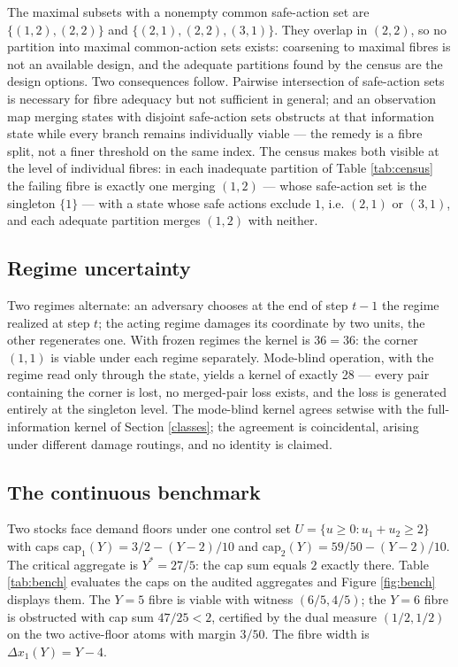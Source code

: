 \documentclass[10pt,twocolumn]{article}
\theoremstyle{definition}
\begin{document}
The maximal subsets with a nonempty common safe-action set are
\(\{(1,2), (2,2)\}\) and \(\{(2,1), (2,2), (3,1)\}\). They overlap in
\((2,2)\), so no partition into maximal common-action sets exists:
coarsening to maximal fibres is not an available design, and the
adequate partitions found by the census are the design options. Two
consequences follow. Pairwise intersection of safe-action sets is
necessary for fibre adequacy but not sufficient in general; and an
observation map merging states with disjoint safe-action sets obstructs
at that information state while every branch remains individually
viable --- the remedy is a fibre split, not a finer threshold on the
same index. The census makes both visible at the level of individual
fibres: in each inadequate partition of Table \ref{tab:census} the
failing fibre is exactly one merging \((1,2)\) --- whose safe-action
set is the singleton \(\{1\}\) --- with a state whose safe actions
exclude \(1\), i.e. \((2,1)\) or \((3,1)\), and each adequate
partition merges \((1,2)\) with neither.

\subsection{Regime uncertainty}\label{regimes}

Two regimes alternate: an adversary chooses at the end of step
\(t - 1\) the regime realized at step \(t\); the acting regime damages
its coordinate by two units, the other regenerates one. With frozen
regimes the kernel is \(36 = 36\): the corner \((1,1)\) is viable under
each regime separately. Mode-blind operation, with the regime read only
through the state, yields a kernel of exactly 28 --- every pair
containing the corner is lost, no merged-pair loss exists, and the loss
is generated entirely at the singleton level. The mode-blind kernel
agrees setwise with the full-information kernel of Section
\ref{classes}; the agreement is coincidental, arising under different
damage routings, and no identity is claimed.

\subsection{The continuous benchmark}\label{benchmark}

Two stocks face demand floors under one control set
\(U = \{u \ge 0 : u_1 + u_2 \ge 2\}\) with caps
\(\mathrm{cap}_1(Y) = 3/2 - (Y - 2)/10\) and
\(\mathrm{cap}_2(Y) = 59/50 - (Y - 2)/10\). The critical aggregate is
\(Y^{*} = 27/5\): the cap sum equals \(2\) exactly there. Table
\ref{tab:bench} evaluates the caps on the audited aggregates and Figure
\ref{fig:bench} displays them. The \(Y = 5\) fibre is viable with
witness \((6/5, 4/5)\); the \(Y = 6\) fibre is obstructed with cap sum
\(47/25 < 2\), certified by the dual measure \((1/2, 1/2)\) on the two
active-floor atoms with margin \(3/50\). The fibre width is
\(\Delta x_1(Y) = Y - 4\).
\end{document}
